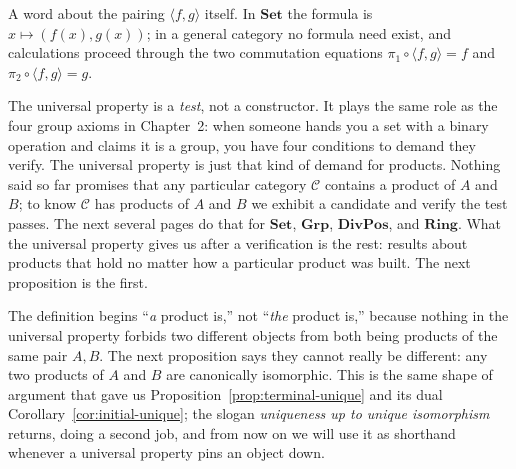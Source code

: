 \noindent A word about the pairing $\langle f, g \rangle$ itself. In
$\mathbf{Set}$ the formula is $x \mapsto (f(x), g(x))$; in a general
category no formula need exist, and calculations proceed through the
two commutation equations $\pi_1 \circ \langle f, g \rangle = f$ and
$\pi_2 \circ \langle f, g \rangle = g$.

\noindent The universal property is a \textit{test}, not a
constructor. It plays the same role as the four group axioms in
Chapter~2: when someone hands you a set with a binary operation and
claims it is a group, you have four conditions to demand they verify.
The universal property is just that kind of demand for products.
Nothing said so far promises that any particular category $\mathcal{C}$
contains a product of $A$ and $B$; to know $\mathcal{C}$ has products
of $A$ and $B$ we exhibit a candidate and verify the test passes. The
next several pages do that for $\mathbf{Set}$, $\mathbf{Grp}$,
$\mathbf{DivPos}$, and $\mathbf{Ring}$. What the universal property
gives us after a verification is the rest: results about products that
hold no matter how a particular product was built. The next
proposition is the first.

The definition begins ``\textit{a} product is,'' not ``\textit{the}
product is,'' because nothing in the universal property forbids two
different objects from both being products of the same pair $A, B$. The
next proposition says they cannot really be different: any two products
of $A$ and $B$ are canonically isomorphic. This is the same shape of
argument that gave us Proposition~\ref{prop:terminal-unique} and its dual
Corollary~\ref{cor:initial-unique}; the slogan
\textit{uniqueness up to unique isomorphism} returns, doing a second job,
and from now on we will use it as shorthand whenever a universal property
pins an object down.

